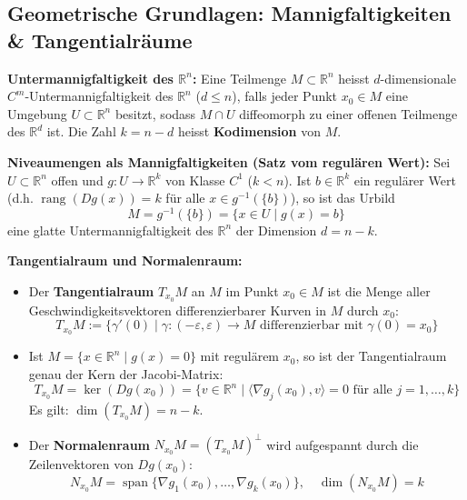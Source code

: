 \subsection{Geometrische Grundlagen: Mannigfaltigkeiten \& Tangentialräume}

\begin{definition}
    \textbf{Untermannigfaltigkeit des $\mathbb{R}^n$:} Eine Teilmenge $M \subset \mathbb{R}^n$ heisst $d$-dimensionale $C^m$-Untermannigfaltigkeit des $\mathbb{R}^n$ ($d \le n$), falls jeder Punkt $x_0 \in M$ eine Umgebung $U \subset \mathbb{R}^n$ besitzt, sodass $M \cap U$ diffeomorph zu einer offenen Teilmenge des $\mathbb{R}^d$ ist.
    Die Zahl $k = n - d$ heisst \textbf{Kodimension} von $M$.
\end{definition}

\begin{theorem}
    \textbf{Niveaumengen als Mannigfaltigkeiten (Satz vom regulären Wert):}
    Sei $U \subset \mathbb{R}^n$ offen und $g: U \to \mathbb{R}^k$ von Klasse $C^1$ ($k < n$). Ist $b \in \mathbb{R}^k$ ein regulärer Wert (d.h. $\operatorname{rang}(Dg(x)) = k$ für alle $x \in g^{-1}(\{b\})$), so ist das Urbild
    $$ M = g^{-1}(\{b\}) = \{ x \in U \mid g(x) = b \} $$
    eine glatte Untermannigfaltigkeit des $\mathbb{R}^n$ der Dimension $d = n - k$.
\end{theorem}

\begin{definition}
    \textbf{Tangentialraum und Normalenraum:}
    \begin{itemize}
        \item Der \textbf{Tangentialraum} $T_{x_0} M$ an $M$ im Punkt $x_0 \in M$ ist die Menge aller Geschwindigkeitsvektoren differenzierbarer Kurven in $M$ durch $x_0$:
        $$ T_{x_0} M := \{ \gamma'(0) \mid \gamma: (-\varepsilon, \varepsilon) \to M \text{ differenzierbar mit } \gamma(0) = x_0 \} $$
        \item Ist $M = \{x \in \mathbb{R}^n \mid g(x) = 0\}$ mit regulärem $x_0$, so ist der Tangentialraum genau der Kern der Jacobi-Matrix:
        $$ T_{x_0} M = \ker(Dg(x_0)) = \{ v \in \mathbb{R}^n \mid \langle \nabla g_j(x_0), v \rangle = 0 \text{ für alle } j=1, \dots, k \} $$
        Es gilt: $\dim(T_{x_0} M) = n - k$.
        \item Der \textbf{Normalenraum} $N_{x_0} M = (T_{x_0} M)^\perp$ wird aufgespannt durch die Zeilenvektoren von $Dg(x_0)$:
        $$ N_{x_0} M = \operatorname{span}\{ \nabla g_1(x_0), \dots, \nabla g_k(x_0) \}, \quad \dim(N_{x_0} M) = k $$
    \end{itemize}
\end{definition}

